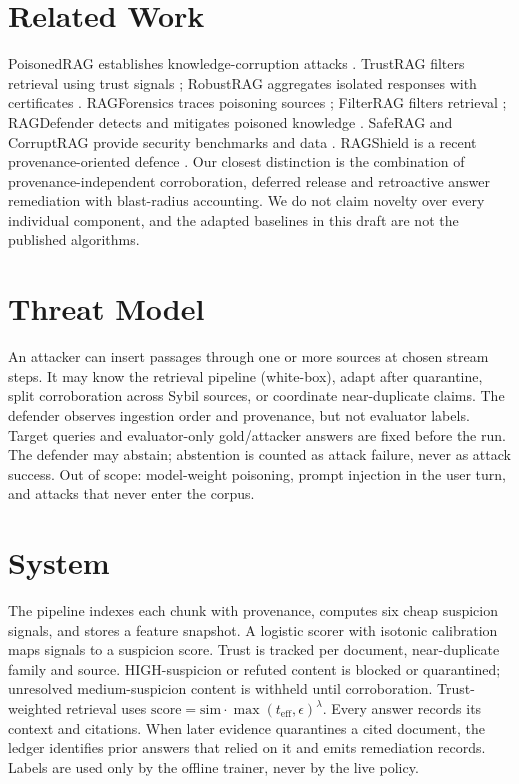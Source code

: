 \documentclass[conference]{IEEEtran}
\begin{document}
\section{Related Work}
PoisonedRAG establishes knowledge-corruption attacks \cite{poisonedrag}.
TrustRAG filters retrieval using trust signals \cite{trustrag}; RobustRAG
aggregates isolated responses with certificates \cite{robustrag}. RAGForensics
traces poisoning sources \cite{ragforensics}; FilterRAG filters retrieval
\cite{filterrag}; RAGDefender detects and mitigates poisoned knowledge
\cite{ragdefender}. SafeRAG and CorruptRAG provide security benchmarks and
data \cite{saferag,corruptrag}. RAGShield is a recent provenance-oriented
defence \cite{ragshield}. Our closest distinction is the combination of
provenance-independent corroboration, deferred release and retroactive answer
remediation with blast-radius accounting. We do not claim novelty over every
individual component, and the adapted baselines in this draft are not the
published algorithms.
\section{Threat Model}
An attacker can insert passages through one or more sources at chosen stream
steps. It may know the retrieval pipeline (white-box), adapt after quarantine,
split corroboration across Sybil sources, or coordinate near-duplicate claims.
The defender observes ingestion order and provenance, but not evaluator labels.
Target queries and evaluator-only gold/attacker answers are fixed before the
run. The defender may abstain; abstention is counted as attack failure, never as
attack success. Out of scope: model-weight poisoning, prompt injection in the
user turn, and attacks that never enter the corpus.
\section{System}
The pipeline indexes each chunk with provenance, computes six cheap suspicion
signals, and stores a feature snapshot. A logistic scorer with isotonic
calibration maps signals to a suspicion score. Trust is tracked per document,
near-duplicate family and source. HIGH-suspicion or refuted content is blocked
or quarantined; unresolved medium-suspicion content is withheld until
corroboration. Trust-weighted retrieval uses
$\mathrm{score}=\mathrm{sim}\cdot\max(t_{\mathrm{eff}},\epsilon)^\lambda$.
Every answer records its context and citations. When later evidence quarantines
a cited document, the ledger identifies prior answers that relied on it and
emits remediation records. Labels are used only by the offline trainer, never
by the live policy.
\end{document}
